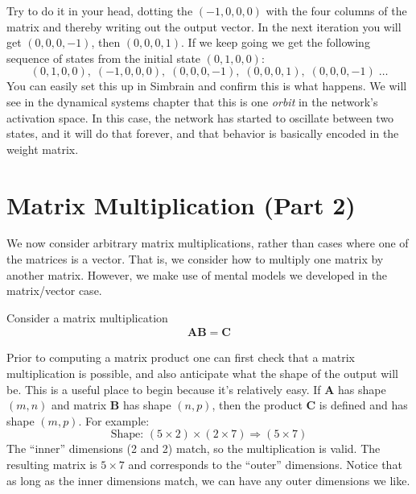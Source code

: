 \noindent Try to do it in your head, dotting the $(-1, 0,0,0)$ with the four columns of the matrix and thereby writing out the output vector. In the next iteration you will get $(0,0,0,-1)$, then $(0,0,0,1)$. If we keep going we get the following sequence of states from the initial state $(0,1,0,0)$:
\begin{equation*}
(0,1,0,0),\; (-1,0,0,0),\; (0,0,0,-1),\; (0,0,0,1),\;  (0,0,0,-1)\; \dots
\end{equation*}
You can easily set this up in Simbrain and confirm this is what happens. We will see in the dynamical systems chapter  that this is one \emph{orbit} in the network's activation space. In this case, the network has started to oscillate between two states, and it will do that forever, and that behavior is basically encoded in the weight matrix.

\section{Matrix Multiplication (Part 2)}\label{matrixMultiplication}


We now consider arbitrary matrix multiplications, rather than cases where one of the matrices is a vector. That is, we consider how to multiply one matrix by another matrix. However, we make use of mental models we developed in the matrix/vector case.

Consider a matrix multiplication 
\begin{align*}
\mathbf{A}\mathbf{B} = \mathbf{C}
\end{align*}

Prior to computing a matrix product one can first check that a matrix multiplication is possible, and also anticipate what the shape of the output will be. This is a useful place to begin because it's relatively easy. If $\mathbf{A}$ has shape $(m, n)$ and matrix $\mathbf{B}$ has shape $(n, p)$, then the product $\mathbf{C}$ is defined and has shape $(m, p)$. For example: 
\[
\text{Shape: } (5 \times 2) \times (2 \times 7) \Rightarrow (5 \times 7)
\]
The ``inner'' dimensions (2 and 2) match, so the multiplication is valid. The resulting matrix is $5 \times 7$ and corresponds to the ``outer'' dimensions. Notice that as long as the inner dimensions match, we can have any outer dimensions we like. 

